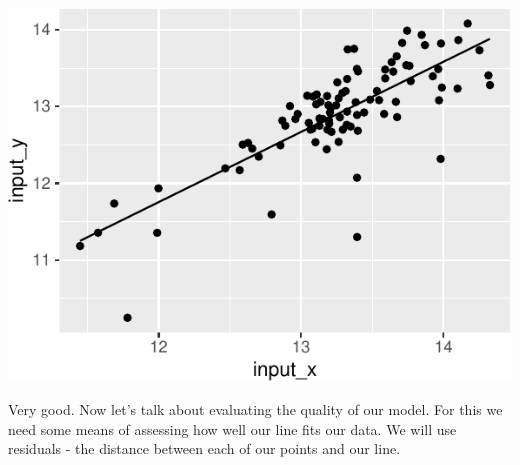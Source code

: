 \documentclass[
]{krantz}
\newenvironment{Shaded}{\begin{snugshade}}{\end{snugshade}}
\newcommand{\AttributeTok}[1]{\textcolor[rgb]{0.77,0.63,0.00}{#1}}
\newcommand{\FunctionTok}[1]{\textcolor[rgb]{0.00,0.00,0.00}{#1}}
\newcommand{\NormalTok}[1]{#1}
\newcommand{\SpecialCharTok}[1]{\textcolor[rgb]{0.00,0.00,0.00}{#1}}
\begin{document}
\begin{center}\includegraphics[width=1\linewidth]{index_files/figure-latex/unnamed-chunk-126-1} \end{center}

Very good. Now let's talk about evaluating the quality of our model. For this we need some means of assessing how well our line fits our data. We will use residuals - the distance between each of our points and our line.

\begin{Shaded}
\end{Shaded}
\end{document}

